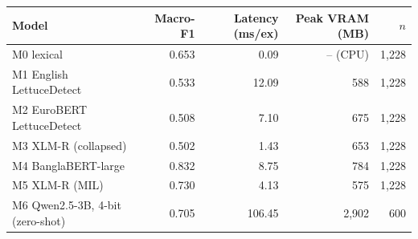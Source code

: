 \begin{tabular}{@{}lrrrr@{}}
\toprule
Model & Macro-F1 & Latency (ms/ex) & Peak VRAM (MB) & $n$ \\
\midrule
M0 lexical & 0.653 & 0.09 & -- (CPU) & 1,228 \\
M1 English LettuceDetect & 0.533 & 12.09 & 588 & 1,228 \\
M2 EuroBERT LettuceDetect & 0.508 & 7.10 & 675 & 1,228 \\
M3 XLM-R (collapsed) & 0.502 & 1.43 & 653 & 1,228 \\
M4 BanglaBERT-large & 0.832 & 8.75 & 784 & 1,228 \\
M5 XLM-R (MIL) & 0.730 & 4.13 & 575 & 1,228 \\
M6 Qwen2.5-3B, 4-bit (zero-shot) & 0.705 & 106.45 & 2,902 & 600 \\
\bottomrule
\end{tabular}
